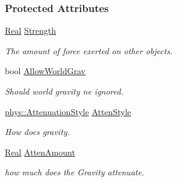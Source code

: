 \subsubsection*{Protected Attributes}
\begin{DoxyCompactItemize}
\item 
\hypertarget{classphys_1_1GravityWell_acc6e405d39cdc6017040902190e16652}{
\hyperlink{namespacephys_af7eb897198d265b8e868f45240230d5f}{Real} \hyperlink{classphys_1_1GravityWell_acc6e405d39cdc6017040902190e16652}{Strength}}
\label{classphys_1_1GravityWell_acc6e405d39cdc6017040902190e16652}

\begin{DoxyCompactList}\small\item\em The amount of force exerted on other objects. \item\end{DoxyCompactList}\item 
\hypertarget{classphys_1_1GravityWell_a8b7106e7670a7bc074c245269d211ba0}{
bool \hyperlink{classphys_1_1GravityWell_a8b7106e7670a7bc074c245269d211ba0}{AllowWorldGrav}}
\label{classphys_1_1GravityWell_a8b7106e7670a7bc074c245269d211ba0}

\begin{DoxyCompactList}\small\item\em Should world gravity ne ignored. \item\end{DoxyCompactList}\item 
\hypertarget{classphys_1_1GravityWell_a89bebdb2ea22c24cb4c30eb31f019166}{
\hyperlink{namespacephys_ad4ce7ee5c1cc164f2ea3d5f28211739f}{phys::AttenuationStyle} \hyperlink{classphys_1_1GravityWell_a89bebdb2ea22c24cb4c30eb31f019166}{AttenStyle}}
\label{classphys_1_1GravityWell_a89bebdb2ea22c24cb4c30eb31f019166}

\begin{DoxyCompactList}\small\item\em How does gravity. \item\end{DoxyCompactList}\item 
\hypertarget{classphys_1_1GravityWell_ad9fd8f2f2dea6a53241ef90852e84503}{
\hyperlink{namespacephys_af7eb897198d265b8e868f45240230d5f}{Real} \hyperlink{classphys_1_1GravityWell_ad9fd8f2f2dea6a53241ef90852e84503}{AttenAmount}}
\label{classphys_1_1GravityWell_ad9fd8f2f2dea6a53241ef90852e84503}

\begin{DoxyCompactList}\small\item\em how much does the Gravity attenuate. \item\end{DoxyCompactList}\end{DoxyCompactItemize}


